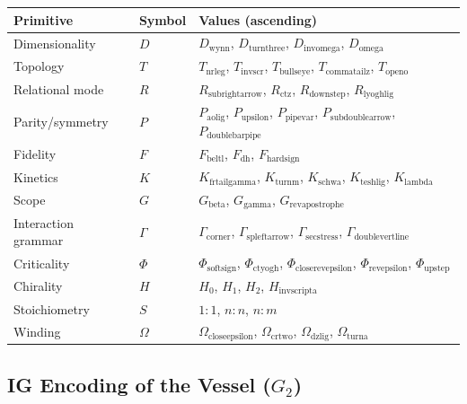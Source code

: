 \documentclass[12pt,a4paper]{article}
\begin{document}
\begin{table}[htbp]
\centering
\small
{}
\begin{tabularx}{\textwidth}{>{\centering\arraybackslash}X >{\centering\arraybackslash}X >{\centering\arraybackslash}X}
\toprule
\rowcolor{gray!25}\textbf{Primitive} & \textbf{Symbol} & \textbf{Values (ascending)} \\
\midrule
\rowcolors{1}{white}{gray!10}
Dimensionality & $D$ & $D_{\text{wynn}}$, $D_{\text{turnthree}}$, $D_{\text{invomega}}$, $D_{\text{omega}}$ \\
Topology & $T$ & $T_{\text{nrleg}}$, $T_{\text{invscr}}$, $T_{\text{bullseye}}$, $T_{\text{commatailz}}$, $T_{\text{openo}}$ \\
Relational mode & $R$ & $R_{\text{subrightarrow}}$, $R_{\text{ctz}}$, $R_{\text{downstep}}$, $R_{\text{lyoghlig}}$ \\
Parity/symmetry & $P$ & $P_{\text{aolig}}$, $P_{\text{upsilon}}$, $P_{\text{pipevar}}$, $P_{\text{subdoublearrow}}$, $P_{\text{doublebarpipe}}$ \\
Fidelity & $F$ & $F_{\text{beltl}}$, $F_{\text{dh}}$, $F_{\text{hardsign}}$ \\
Kinetics & $K$ & $K_{\text{frtailgamma}}$, $K_{\text{turnm}}$, $K_{\text{schwa}}$, $K_{\text{teshlig}}$, $K_{\text{lambda}}$ \\
Scope & $G$ & $G_{\text{beta}}$, $G_{\text{gamma}}$, $G_{\text{revapostrophe}}$ \\
Interaction grammar & $\Gamma$ & $\Gamma_{\text{corner}}$, $\Gamma_{\text{spleftarrow}}$, $\Gamma_{\text{secstress}}$, $\Gamma_{\text{doublevertline}}$ \\
Criticality & $\Phi$ & $\Phi_{\text{softsign}}$, $\Phi_{\text{ctyogh}}$, $\Phi_{\text{closerevepsilon}}$, $\Phi_{\text{revepsilon}}$, $\Phi_{\text{upstep}}$ \\
Chirality & $H$ & $H_0$, $H_1$, $H_2$, $H_{\text{invscripta}}$ \\
Stoichiometry & $S$ & $1{:}1$, $n{:}n$, $n{:}m$ \\
Winding & $\Omega$ & $\Omega_{\text{closeepsilon}}$, $\Omega_{\text{crtwo}}$, $\Omega_{\text{dzlig}}$, $\Omega_{\text{turna}}$ \\
\bottomrule
\end{tabularx}
\end{table}

\subsection{IG Encoding of the Vessel ($G_2$)}
\end{document}
